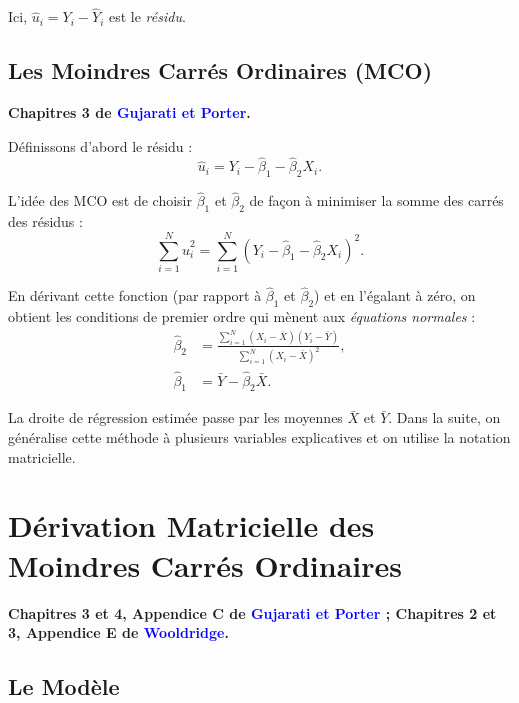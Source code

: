 \documentclass[14pt]{extarticle} %
\newcommand{\livre}[1]{\textcolor{blue}{#1}}
\begin{document}
Ici, \(\hat{u}_i = Y_i - \hat{Y}_i\) est le \emph{résidu}.

\subsection{Les Moindres Carrés Ordinaires (MCO)}
\textbf{Chapitres 3 de \livre{Gujarati et Porter}.}

Définissons d’abord le résidu :
\[
\hat{u}_i = Y_i - \hat{\beta}_1 - \hat{\beta}_2 X_i.
\]

L’idée des MCO est de choisir \(\hat{\beta}_1\) et \(\hat{\beta}_2\) de façon à minimiser la somme des carrés des résidus :
\[
\sum_{i=1}^{N} \hat{u}_i^2 = \sum_{i=1}^{N} (Y_i - \hat{\beta}_1 - \hat{\beta}_2 X_i)^2.
\]

En dérivant cette fonction (par rapport à \(\hat{\beta}_1\) et \(\hat{\beta}_2\)) et en l’égalant à zéro, on obtient les conditions de premier ordre qui mènent aux \emph{équations normales} :
\begin{align*}
    \hat{\beta}_2 &= \frac{\sum_{i=1}^{N} (X_i - \bar{X})(Y_i - \bar{Y})}{\sum_{i=1}^{N} (X_i - \bar{X})^2}, \\
    \hat{\beta}_1 &= \bar{Y} - \hat{\beta}_2 \bar{X}.
\end{align*}

La droite de régression estimée passe par les moyennes \(\bar{X}\) et \(\bar{Y}\). Dans la suite, on généralise cette méthode à plusieurs variables explicatives et on utilise la notation matricielle.

\section{Dérivation Matricielle des Moindres Carrés Ordinaires}

\textbf{Chapitres 3 et 4, Appendice C de \livre{Gujarati et Porter} ; Chapitres 2 et 3, Appendice E de \livre{Wooldridge}.}

\subsection{Le Modèle}
\end{document}
